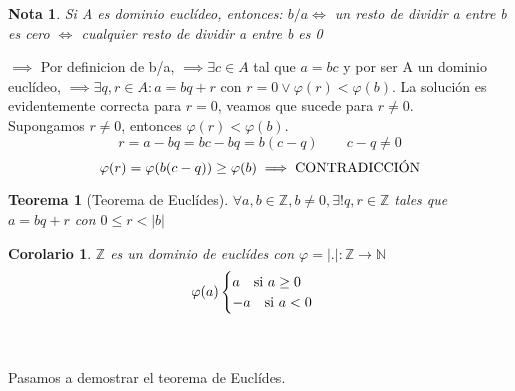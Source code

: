 \documentclass[11pt, a4paper, titlepage]{article}
\makeatletter
\renewenvironment{proof}[1][\proofname] {\vspace{-15pt}\par\pushQED{\qed}\normalfont\topsep6\p@\@plus6\p@\relax\trivlist\item[\hskip\labelsep\it#1\@addpunct{.}]\ignorespaces}{\popQED\endtrivlist\@endpefalse}
\providecommand{\ent}{\mathbb{Z}}
\providecommand{\nat}{\mathbb{N}}
\providecommand{\abs}[1]{\lvert#1\rvert}
\theoremstyle{theorem-style}
\newtheorem*{nth}{Teorema}
\newtheorem{ncor}{Corolario}
\theoremstyle{definition-style}
\theoremstyle{remark-style}
\newtheorem*{nota}{Nota}
\theoremstyle{example-style}
\makeatother
\begin{document}
\begin{nota}
	Si A es dominio euclídeo, entonces: 
$b/a \iff$ un resto de dividir a entre b es cero $\iff$ cualquier resto de dividir a entre b es 0 
\end{nota}
\begin{proof}
	$\boxed{\implies}$ Por definicion de b/a, $\implies \exists c \in A$ tal que $a=bc$ y por ser A un dominio euclídeo, $\implies \exists q,r \in 		A : 	a = bq + r $ con $r=0 \vee \varphi(r) < \varphi(b)$. La solución 	es evidentemente correcta para $r = 0$, veamos que sucede para $r \neq 	0$.
\\
Supongamos $r \neq 0$, entonces $\varphi(r) < \varphi(b)$. 
$$r = a - bq = bc - bq = b(c-q) \quad \quad c-q \neq 0$$
$$\varphi(r) = \varphi(b(c-q)) \ge \varphi(b) \implies \textup{CONTRADICCIÓN}$$  
\end{proof}

\begin{nth}[Teorema de Euclídes]

	$\forall a,b \in \ent, b \neq 0, \exists !q,r \in \ent$ tales que $a = bq + r $ con $0 \le r < |b|$
\end{nth}

\begin{ncor}
$\ent$ es un dominio de euclídes con $\varphi = \abs{.}: \ent \to \nat$
\[
\varphi(a) \begin{cases}
	a  \quad \textup{si } a \ge 0\\
	-a \quad \textup{si } a < 0
	
\end{cases}\]
\end{ncor}

\ \\\\Pasamos a demostrar el teorema de Euclídes.
\end{document}
